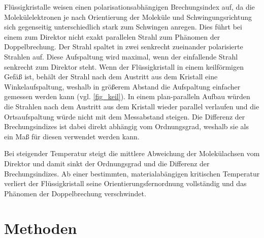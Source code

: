 \documentclass[
	a4paper,
	12pt,
	pagesize,
	ngerman
]{scrartcl}
\begin{document}
	Flüssigkristalle weisen einen polarisationsabhängigen Brechungsindex auf, da die Molekülelektronen je nach Orientierung der Moleküle und Schwingungsrichtung sich gegenseitig unterschiedlich stark zum Schwingen anregen. %
	Dies führt bei einem zum Direktor nicht exakt parallelen Strahl zum Phänomen der Doppelbrechung. %
	Der Strahl spaltet in zwei senkrecht zueinander polarisierte Strahlen auf.
	Diese Aufspaltung wird maximal, wenn der einfallende Strahl senkrecht zum Direktor steht.
	Wenn der Flüssigkristall in einem keilförmigen Gefäß ist, behält der Strahl nach dem Austritt aus dem Kristall eine Winkelaufspaltung, weshalb in größerem Abstand die Aufspaltung einfacher gemessen werden kann (vgl. \cref{fig_keil}).
	In einem plan-paralleln Aufbau würden die Strahlen nach dem Austritt aus dem Kristall wieder parallel verlaufen und die Ortsaufspaltung würde nicht mit dem Messabstand steigen.
  Die Differenz der Brechungsindizes ist dabei direkt abhängig vom Ordnungsgrad, weshalb sie als ein Maß für diesen verwendet werden kann.

	Bei steigender Temperatur steigt die mittlere Abweichung der Molekülachsen vom Direktor und damit sinkt der Ordnungsgrad und die Differenz der Brechungsindizes.
	Ab einer bestimmten, materialabängigen kritischen Temperatur verliert der Flüssigkristall seine Orientierungsfernordnung vollständig und das Phänomen der Doppelbrechung verschwindet.

	\section{Methoden}
\end{document}
